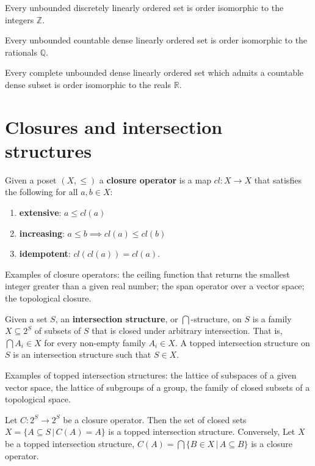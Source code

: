 \documentclass{article}
\newcommand{\marginleft}[1] {\reversemarginpar\marginpar{#1}}
\begin{document}
\begin{prop}
	Every unbounded discretely linearly ordered set is order isomorphic to the integers $\mathbb{Z}$.
\end{prop}

\begin{prop}
	 Every unbounded countable dense linearly ordered set is order isomorphic to the rationals $\mathbb{Q}$.
\end{prop}

\begin{prop}
	Every complete unbounded dense linearly ordered set which admits a countable dense subset is order isomorphic to the reals $\mathbb{R}$.
\end{prop}

\section{Closures and intersection structures}

\begin{defn}
	Given a poset $(X, \leq)$ \marginleft{Closure} a \textbf{closure operator} is a map $cl : X \to X$ that satisfies the following for all $a,b \in X$:
	\begin{enumerate}
		\item \textbf{extensive}: $a \leq cl(a)$
		\item \textbf{increasing}: $a \leq b \implies cl(a) \leq cl(b)$
		\item \textbf{idempotent}: $cl(cl(a)) = cl(a)$.
	\end{enumerate}
\end{defn}

Examples of closure operators: the ceiling function that returns the smallest integer greater than a given real number; the span operator over a vector space; the topological closure.

\begin{defn}
	Given a set $S$, \marginleft{Intersection \\structure} an \textbf{intersection structure}, or $\bigcap$-structure, on $S$ is a family $X \subseteq 2^{S}$ of subsets of $S$ that is closed under arbitrary intersection. That is, $\bigcap A_i \in X$ for every non-empty family $A_i \in X$. A topped intersection structure on $S$ is an intersection structure such that $S \in X$.
\end{defn}

Examples of topped intersection structures: the lattice of subspaces of a given vector space, the lattice of subgroups of a group, the family of closed subsets of a topological space.

\begin{prop}
	Let $C : 2^{S} \to 2^{S}$ be a closure operator. Then the set of closed sets $X = \{ A \subseteq S \, | \, C(A) = A\}$ is a topped intersection structure. Conversely, Let $X$ be a topped intersection structure, $C(A) = \bigcap \{B \in X \, | \, A \subseteq B \}$ is a closure operator.
\end{prop}



\end{document}
